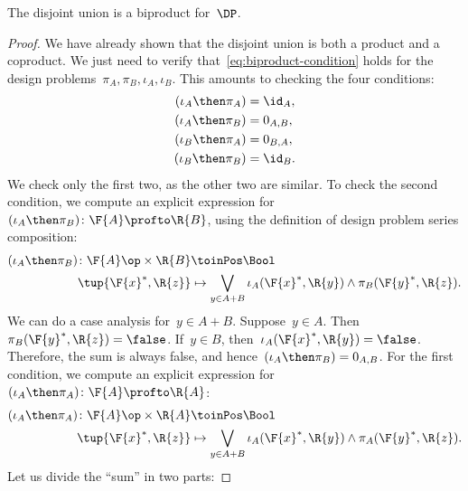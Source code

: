 \begin{lemma}
  The disjoint union is a biproduct for~$\DP$.
\end{lemma}
\begin{proof}
  We have already shown that the disjoint union is both
  a product and a coproduct. We just need to verify that~\cref{eq:biproduct-condition} holds
  for the design problems~$\pi_A, \pi_B, \iota_A, \iota_B$.
  This amounts to checking the four conditions:
  \begin{equation}
    \begin{aligned}
      (\iota_A\then \pi_A) &= \id_{A}, \\
      (\iota_A\then \pi_B) &= 0_{A,B}, \\
      (\iota_B\then \pi_A) &= 0_{B,A},\\
      (\iota_B\then \pi_B) &= \id_{B}.
    \end{aligned}
  \end{equation}
  We check only the first two, as the other two are similar.
  To check the second condition, we compute an explicit expression for~$(\iota_A\then \pi_B)\colon \F{A} \profto \R{B}$, using the definition
  of design problem series composition:
  \begin{equation}
    \begin{aligned}
      (\iota_A\then \pi_B) \colon  \F{A}\op\times \R{B} & \toinPos \Bool \\
      \tup{\F{x}^*, \R{z}} &\mapsto
      \bigvee_{y \in A + B} \iota_A(\F{x}^*,\R{y}) \wedge \pi_B(\F{y}^*,\R{z}).
    \end{aligned}
  \end{equation}
  We can do a case analysis for~$y\in A+B$. Suppose~$y\in A$.
  Then~$\pi_B(\F{y}^*,\R{z}) = \false$. If~$y \in B$, then~$\iota_A(\F{x}^*,\R{y}) = \false$.
  Therefore, the sum is always false, and hence~$(\iota_A\then \pi_B) = 0_{A,B}$.
  For the first condition, we compute an explicit expression for~$(\iota_A\then \pi_A) \colon \F{A} \profto \R{A}$:
  \begin{equation}
    \begin{aligned}
      (\iota_A\then \pi_A) \colon  \F{A}\op\times \R{A} & \toinPos \Bool \\
      \tup{\F{x}^*, \R{z}} &\mapsto
      \bigvee_{y \in A + B} \iota_A(\F{x}^*,\R{y}) \wedge \pi_A(\F{y}^*,\R{z}).
    \end{aligned}
  \end{equation}
  Let us divide the ``sum'' in two parts:

\end{proof}
